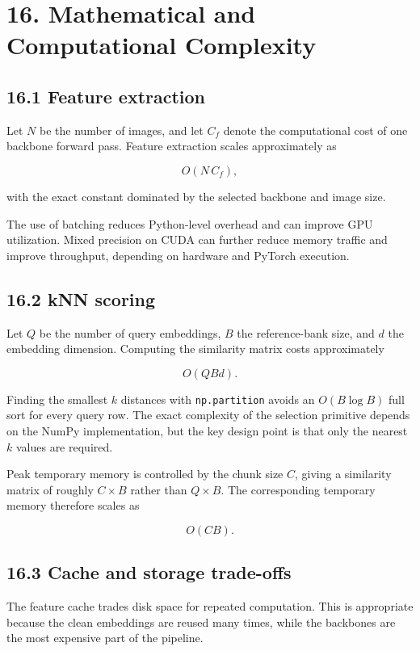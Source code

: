 \documentclass[
  11pt,
]{article}
\begin{document}
\section{16. Mathematical and Computational
Complexity}\label{mathematical-and-computational-complexity}

\subsection{16.1 Feature extraction}\label{feature-extraction}

Let \(N\) be the number of images, and let \(C_f\) denote the
computational cost of one backbone forward pass. Feature extraction
scales approximately as

\[
O(N\,C_f),
\]

with the exact constant dominated by the selected backbone and image
size.

The use of batching reduces Python-level overhead and can improve GPU
utilization. Mixed precision on CUDA can further reduce memory traffic
and improve throughput, depending on hardware and PyTorch execution.

\subsection{16.2 kNN scoring}\label{knn-scoring}

Let \(Q\) be the number of query embeddings, \(B\) the reference-bank
size, and \(d\) the embedding dimension. Computing the similarity matrix
costs approximately

\[
O(QBd).
\]

Finding the smallest \(k\) distances with \texttt{np.partition} avoids
an \(O(B\log B)\) full sort for every query row. The exact complexity of
the selection primitive depends on the NumPy implementation, but the key
design point is that only the nearest \(k\) values are required.

Peak temporary memory is controlled by the chunk size \(C\), giving a
similarity matrix of roughly \(C\times B\) rather than \(Q\times B\).
The corresponding temporary memory therefore scales as

\[
O(CB).
\]

\subsection{16.3 Cache and storage
trade-offs}\label{cache-and-storage-trade-offs}

The feature cache trades disk space for repeated computation. This is
appropriate because the clean embeddings are reused many times, while
the backbones are the most expensive part of the pipeline.
\end{document}
